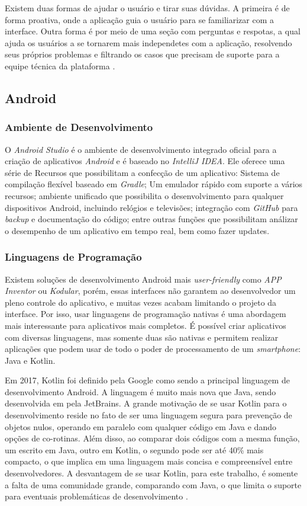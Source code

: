 Existem duas formas de ajudar o usuário e tirar suas dúvidas. A primeira é de forma proativa, onde a aplicação guia o usuário para se familiarizar com a interface. Outra forma é por meio de uma seção com perguntas e respotas, a qual ajuda os usuários a se tornarem mais independetes com a aplicação, resolvendo seus próprios problemas e filtrando os casos que precisam de suporte para a equipe técnica da plataforma \cite{site:nielsenHelpandDoc}.

\subsection{Android}
\subsubsection{Ambiente de Desenvolvimento}

O \textit{Android Studio} é o ambiente de desenvolvimento integrado oficial para a criação de aplicativos \textit{Android} e é baseado no \textit{IntelliJ IDEA}. Ele oferece uma série de Recursos que possibilitam a confecção de um aplicativo: Sistema de compilação flexível baseado em \textit{Gradle}; Um emulador rápido com suporte a vários recursos; ambiente unificado que possibilita o desenvolvimento para qualquer dispositivos Android, incluindo relógios e televisões; integração com \textit{GitHub} para \textit{backup} e documentação do código; entre outras funções que possibilitam análizar o desempenho de um aplicativo em tempo real, bem como fazer updates. \cite{site:androidstudio}

\subsubsection{Linguagens de Programação}

Existem soluções de desenvolvimento Android mais \textit{user-friendly} como \textit{APP Inventor} ou \textit{Kodular}, porém, essas interfaces não garantem ao desenvolvedor um pleno controle do aplicativo, e muitas vezes acabam limitando o projeto da interface. Por isso, usar linguagens de programação nativas é uma abordagem mais interessante para aplicativos mais completos. É possível criar aplicativos com diversas linguagens, mas somente duas são nativas e permitem realizar aplicações que podem usar de todo o poder de processamento de um \textit{smartphone}: Java e Kotlin.

Em 2017, Kotlin foi definido pela Google como sendo a principal linguagem de desenvolvimento Android. A linguagem é muito mais nova que Java, sendo desenvolvida em pela JetBrains. A grande motivação de se usar Kotlin para o desenvolvimento reside no fato de ser uma linguagem segura para prevenção de objetos nulos, operando em paralelo com qualquer código em Java e dando opções de co-rotinas. Além disso, ao comparar dois códigos com a mesma função, um escrito em Java, outro em Kotlin, o segundo pode ser até 40\% mais compacto, o que implica em uma linguagem mais concisa e compreensível entre desenvolvedores. A desvantagem de se usar Kotlin, para este trabalho, é somente a falta de uma comunidade grande, comparando com Java, o que limita o suporte para eventuais problemáticas de desenvolvimento \cite{site:kotlinxjava}.

